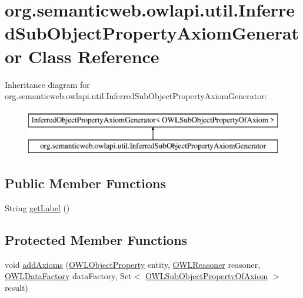 \hypertarget{classorg_1_1semanticweb_1_1owlapi_1_1util_1_1_inferred_sub_object_property_axiom_generator}{\section{org.\-semanticweb.\-owlapi.\-util.\-Inferred\-Sub\-Object\-Property\-Axiom\-Generator Class Reference}
\label{classorg_1_1semanticweb_1_1owlapi_1_1util_1_1_inferred_sub_object_property_axiom_generator}
}
Inheritance diagram for org.\-semanticweb.\-owlapi.\-util.\-Inferred\-Sub\-Object\-Property\-Axiom\-Generator\-:\begin{figure}[H]
\begin{center}
\leavevmode
\includegraphics[height=2.000000cm]{classorg_1_1semanticweb_1_1owlapi_1_1util_1_1_inferred_sub_object_property_axiom_generator}
\end{center}
\end{figure}
\subsection*{Public Member Functions}
\begin{DoxyCompactItemize}
\item 
String \hyperlink{classorg_1_1semanticweb_1_1owlapi_1_1util_1_1_inferred_sub_object_property_axiom_generator_a888da755d354b8041c0fa0d0fa9db4d7}{get\-Label} ()
\end{DoxyCompactItemize}
\subsection*{Protected Member Functions}
\begin{DoxyCompactItemize}
\item 
void \hyperlink{classorg_1_1semanticweb_1_1owlapi_1_1util_1_1_inferred_sub_object_property_axiom_generator_a93965d54b0d98c1367746cb02a0ae722}{add\-Axioms} (\hyperlink{interfaceorg_1_1semanticweb_1_1owlapi_1_1model_1_1_o_w_l_object_property}{O\-W\-L\-Object\-Property} entity, \hyperlink{interfaceorg_1_1semanticweb_1_1owlapi_1_1reasoner_1_1_o_w_l_reasoner}{O\-W\-L\-Reasoner} reasoner, \hyperlink{interfaceorg_1_1semanticweb_1_1owlapi_1_1model_1_1_o_w_l_data_factory}{O\-W\-L\-Data\-Factory} data\-Factory, Set$<$ \hyperlink{interfaceorg_1_1semanticweb_1_1owlapi_1_1model_1_1_o_w_l_sub_object_property_of_axiom}{O\-W\-L\-Sub\-Object\-Property\-Of\-Axiom} $>$ result)
\end{DoxyCompactItemize}



